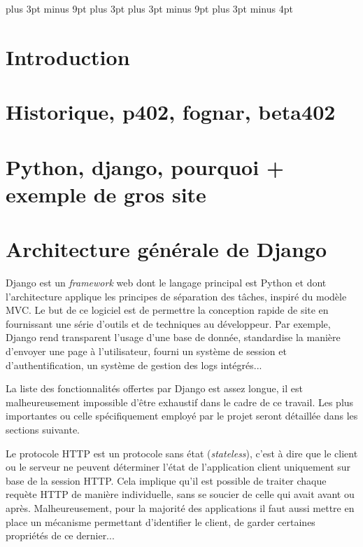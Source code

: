 \documentclass[a4paper,12pt]{article}
\begin{document}
\setlength{\footskip}{40pt}

\abovedisplayskip=9pt plus 3pt minus 9pt
\abovedisplayshortskip=6pt plus 3pt
\belowdisplayskip=9pt plus 3pt minus 9pt
\belowdisplayshortskip=9pt plus 3pt minus 4pt
\setlength{\parskip}{0.5ex plus 0.2ex minus 0.2ex}
\setlength{\parindent}{0pt}

\newpage
\setlength{\voffset}{0pt}
\setcounter{tocdepth}{2}
\tableofcontents

\newpage

\section{Introduction}
\section{Historique, p402, fognar, beta402}
\section{Python, django, pourquoi + exemple de gros site}

\section{Architecture générale de Django}

Django est un \textit{framework} web dont le langage principal est Python et
dont l'architecture applique les principes de séparation des tâches, inspiré du
modèle MVC. Le but de ce logiciel est de permettre la conception rapide de site
en fournissant une série d'outils et de techniques au développeur. Par exemple,
Django rend transparent l'usage d'une base de donnée, standardise la manière
d'envoyer une page à l'utilisateur, fourni un système de session et d'authentification,
un système de gestion des logs intégrés...

La liste des fonctionnalités offertes par Django est assez longue, il est malheureusement
impossible d'être exhaustif dans le cadre de ce travail. Les plus importantes
ou celle spécifiquement employé par le projet seront détaillée dans les sections suivante.

Le protocole HTTP est un protocole sans état (\textit{stateless}), c'est à dire
que le client ou le serveur ne peuvent déterminer l'état de l'application client uniquement
sur base de la session HTTP. Cela implique qu'il est possible de traiter chaque requète HTTP
de manière individuelle, sans se soucier de celle qui avait avant ou après. Malheureusement,
pour la majorité des applications il faut aussi mettre en place un mécanisme permettant
d'identifier le client, de garder certaines propriétés de ce dernier...
\end{document}
